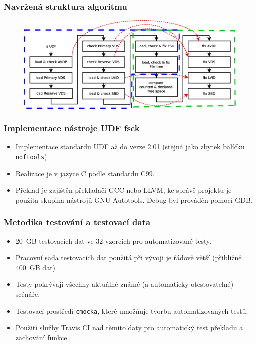 \documentclass[aspectratio=169]{beamer}
\begin{document}
        \begin{frame}
            \frametitle{Navržená struktura algoritmu}
			\vspace{30 pt}
			\center
            \begin{figure}
			    \includegraphics[width=14.8cm]{steps-korekce.eps}
            \end{figure}
        \end{frame}
		\begin{frame}
			\frametitle{Implementace nástroje UDF fsck} %
			\vspace{40 pt}
		    \begin{itemize}
                \Large\item Implementace standardu UDF až do verze 2.01 (stejná jako zbytek balíčku \texttt{udftools})
                \Large\item Realizace je v jazyce C podle standardu C99.
                \Large\item Překlad je zajištěn překladači GCC nebo LLVM, ke správě projektu je použita skupina nástrojů GNU Autotools. Debug byl prováděn pomocí GDB.
            \end{itemize}
		\end{frame}
        \begin{frame}
            \frametitle{Metodika testování a testovací data}
            \vspace{40pt}
            \begin{itemize}
                \Large\item 20~GB testovacích dat ve 32 vzorcích pro automatizované testy.
                \Large\item Pracovní sada testovacích dat použitá při vývoji je řádově větší (přibližně 400~GB dat)
                \Large\item Testy pokrývají všechny aktuálně známé (a automaticky otestovatelné) scénáře.
                \Large\item Testovací prostředí \texttt{cmocka}, které umožňuje tvorbu automatizovaných testů.
                \Large\item Použití služby Travis CI nad těmito daty pro automatický test překladu a zachování funkce.
            \end{itemize}
        \end{frame}
\end{document}
